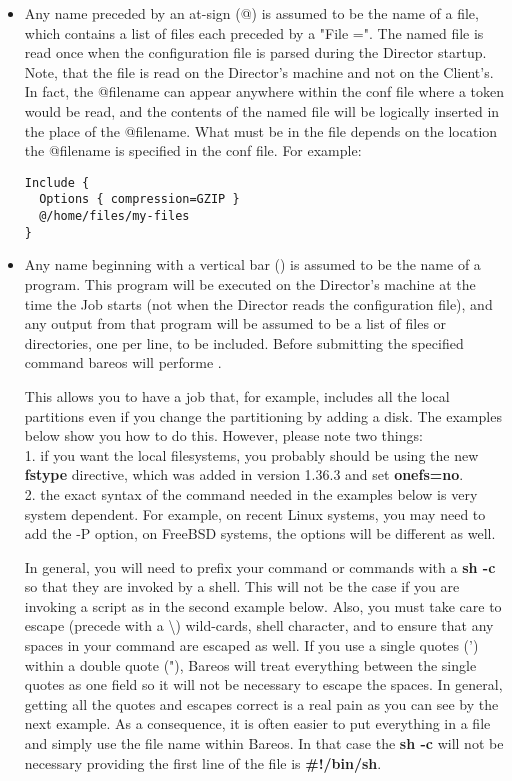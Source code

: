 \begin{itemize}
\item Any name preceded by an at-sign (@) is assumed to be the  name of a
   file, which contains a list of files each preceded by a "File =".  The
   named file is read once when the configuration file is parsed during the
   Director startup.  Note, that the file is read on the Director's machine
   and not on the Client's.  In fact, the @filename can appear anywhere
   within the conf file where a token would be read, and the contents of
   the named file will be logically inserted in the place of the @filename.
   What must be in the file depends on the location the @filename is
   specified in the conf file.  For example:

\footnotesize
\begin{verbatim}
Include {
  Options { compression=GZIP }
  @/home/files/my-files
}
\end{verbatim}
\normalsize

\item Any name beginning with a vertical bar ({\textbar}) is  assumed to
   be the name of a program.  This program will be executed on the Director's
   machine at the time the Job starts (not when the Director reads the
   configuration file), and any output from that program will be assumed to
   be a list of files or directories, one per line, to be included. Before
   submitting the specified command bareos will performe
   .

   This allows you to have a job that, for example, includes all the local
   partitions even if you change the partitioning by adding a disk.  The
   examples below show you how to do this.  However, please note two
   things: \\
   1.  if you want the local filesystems, you probably should be
   using the new {\bf fstype} directive, which was added in version 1.36.3
   and set {\bf onefs=no}.
   \\

   2.  the exact syntax of the command needed in the examples below is very
   system dependent.  For example, on recent Linux systems, you may need to
   add the -P option, on FreeBSD systems, the options will be different as
   well.

   In general, you will need to prefix your command or commands with a {\bf
   sh -c} so that they are invoked by a shell.  This will not be the case
   if you are invoking a script as in the second example below.  Also, you
   must take care to escape (precede with a \textbackslash{}) wild-cards,
   shell character, and to ensure that any spaces in your command are
   escaped as well.  If you use a single quotes (') within a double quote
   ("), Bareos will treat everything between the single quotes as one field
   so it will not be necessary to escape the spaces.  In general, getting
   all the quotes and escapes correct is a real pain as you can see by the
   next example.  As a consequence, it is often easier to put everything in
   a file and simply use the file name within Bareos.  In that case the
   {\bf sh -c} will not be necessary providing the first line of the file
   is {\bf \#!/bin/sh}.


\end{itemize}
